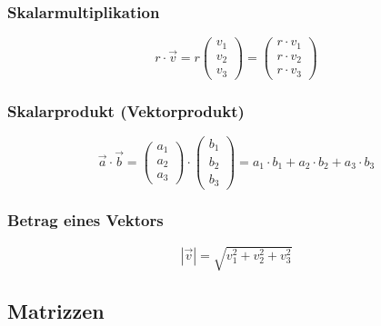 \subsubsection{Skalarmultiplikation}
\label{ssub:skalarmultiplikation}

\begin{equation}
	r \cdot \overrightarrow{v} = r \left( \begin{array}{c} v_1\\v_2\\v_3\end{array}\right)
	= \left( \begin{array}{c}r \cdot v_1\\r \cdot v_2\\r \cdot v_3\end{array}\right)
\end{equation}

\subsubsection{Skalarprodukt (Vektorprodukt)} 
\label{ssub:skalarprodukt_vektorprodukt_}

\begin{equation}
	\overrightarrow{a} \cdot \overrightarrow{b}
	= \left( \begin{array}{c} a_1\\a_2\\a_3\end{array}\right) \cdot \left( \begin{array}{c} b_1\\b_2\\b_3\end{array}\right)
	= a_1 \cdot b_1 + a_2 \cdot b_2 + a_3 \cdot b_3
\end{equation}

\subsubsection{Betrag eines Vektors}
\label{ssub:betrag_eines_vektors}

\begin{equation}
	|\overrightarrow{v}| = \sqrt{v_1^2 + v_2^2 + v_3^2}
\end{equation}

\subsection{Matrizzen} 
\label{sub:matrizzen}

